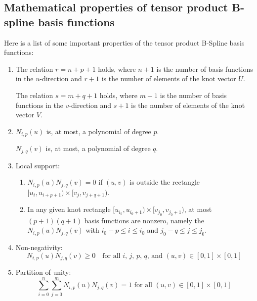 \subsection{Mathematical properties of tensor product B-spline basis functions}
Here is a list of some important properties of the tensor product B-Spline basis functions:

\begin{enumerate}

    \item The relation $r = n + p + 1$ holds, where $n+1$ is the number of basis functions in the $u$-direction and $r+1$ is the number of elements of the knot vector $U$.

    The relation $s = m + q + 1$ holds, where $m+1$ is the number of basis functions in the $v$-direction and $s+1$ is the number of elements of the knot vector $V$.
    
    \item $N_{i,p}(u)$ is, at most, a polynomial of degree $p$.
    
    $N_{j,q}(v)$ is, at most, a polynomial of degree $q$.
    
    \item Local support:
    \begin{enumerate}
        \item $N_{i,p}(u)N_{j,q}(v)=0$ if $(u,v)$ is outside the rectangle $[u_{i}, u_{i+p+1}) \times [v_{j}, v_{j+q+1})$.
        \item In any given knot rectangle $[u_{i_{0}}, u_{i_{0}+1}) \times [v_{j_{0}}, v_{j_{0}+1})$, at most $(p+1)(q+1)$ basis functions are nonzero, namely the $N_{i,p}(u)N_{j,q}(v)$ with $i_{0}-p \leq i \leq i_{0}$ and $j_{0}-q \leq j \leq j_{0}$.
    \end{enumerate}
    
    \item Non-negativity:
        \begin{equation*}
            N_{i,p}(u)N_{j,q}(v) \geq 0 \quad \text{for all $i$, $j$, $p$, $q$, and $(u,v) \in [0, 1] \times [0, 1]$}
        \end{equation*}

    \item Partition of unity:
        \begin{equation*}
            \sum_{i=0}^n  \sum_{j=0}^{m} N_{i,p}(u) N_{j,q}(v) = 1 \text{ for all } (u,v) \in [0, 1] \times [0, 1]
        \end{equation*}
        

\end{enumerate}
